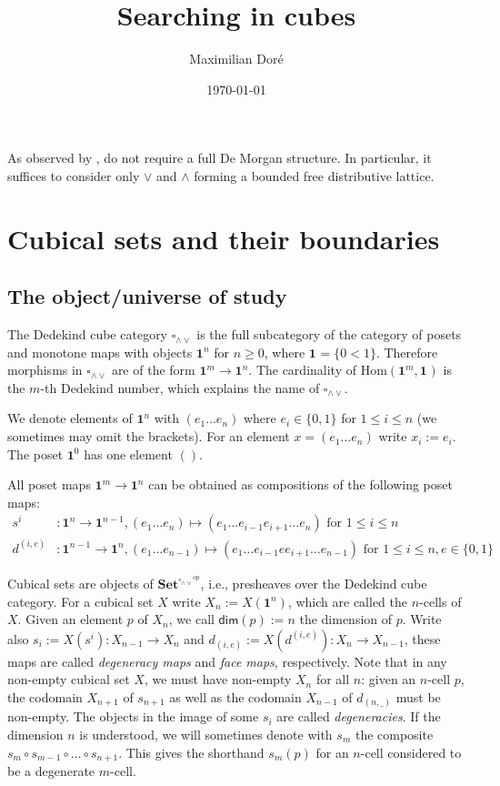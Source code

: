 \documentclass[11pt]{article}
\title{ Searching in cubes}
\author{ Maximilian Dor\'e}
\date{\today}
\theoremstyle{definition}
\newcommand{\mdef}{:=}
\newcommand{\mname}[1]{\textit{{#1}}}
\newcommand{\join}{\wedge}
\newcommand{\meet}{\vee}
\newcommand{\dedekind}{\square_{\join \meet}}
\newcommand{\pint}[1]{\mathbf{1}^{#1}}
\newcommand{\psh}[1]{\mathbf{Set}^{{#1}^{op}}}
\renewcommand{\hom}[2]{\text{Hom}({#1} , {#2})}
\renewcommand{\dim}[1]{\mathsf{dim}({#1})}
\newcommand{\smap}[1]{s_{{#1}}}
\newcommand{\dmap}[2]{d_{({#1} , {#2})}}
\begin{document}
\maketitle	

As observed by \cite{orton17_axiom_model_cubic_type_theor_topos}, do not require
a full De Morgan structure. In particular, it suffices to consider only $\meet$
and $\join$ forming a bounded free distributive lattice.

\section{Cubical sets and their boundaries}

\subsection{The object/universe of study}

The Dedekind cube category $\dedekind$ is the full subcategory of the category
of posets and monotone maps with objects $\pint{n}$ for $n \geq 0$, where $\pint{}
= \{ 0<1 \}$. Therefore morphisms in $\dedekind$ are of
the form $\pint{m} \to \pint{n}$. The cardinality of $\hom{\pint{m}}{\pint{}}$ is the
$m$-th Dedekind number, which explains the name of $\dedekind$.

We denote elements of $\pint{n}$ with $(e_1 \ldots e_n)$ where $e_i \in \{0,1\}$
for $1 \leq i \leq n$ (we sometimes may omit the brackets). For an element $x =
(e_1 \ldots e_n)$ write $x_i \mdef e_i$. The poset $\pint{0}$ has one element
$()$.

All poset maps $\pint{m} \to \pint{n}$ can be obtained as
compositions of the following poset maps:
\begin{align*}
  s^i &: \pint{n} \to \pint{n-1}, (e_1 \ldots e_n) \mapsto (e_1 \ldots e_{i-1} e_{i+1} \ldots e_n) \text{ for } 1 \leq i \leq n\\
  d^{(i,e)} &: \pint{n-1} \to \pint{n}, 
      (e_1 \ldots e_{n-1}) \mapsto (e_1 \ldots e_{i-1} e e_{i+1} \ldots e_{n-1}) \text{ for } 1 \leq i \leq n, e \in \{0,1\}
\end{align*}


Cubical sets are objects of $\psh{\dedekind}$, i.e., presheaves over the
Dedekind cube category. For a cubical set $X$ write $X_n \mdef X(\pint{n})$,
which are called the $n$-cells of $X$. Given an element $p$ of $X_n$, we call
$\dim{p} \mdef n$ the dimension of $p$. Write also $\smap{i} \mdef X(s^i) : X_{n-1}
\to X_n$ and $\dmap{i}{e} \mdef X(d^{(i,e)}) : X_n \to X_{n-1}$, these maps are
called \mname{degeneracy maps} and \mname{face maps}, respectively. Note that in any non-empty
cubical set $X$, we must have non-empty $X_n$ for all $n$: given an $n$-cell
$p$, the codomain $X_{n+1}$ of $\smap{n+1}$ as well as the codomain $X_{n-1}$ of
$\dmap{n}{\_}$ must be non-empty. The objects in the image of some $\smap{i}$ are
called \mname{degeneracies}. If the dimension $n$ is understood, we will sometimes
denote with $\smap{m}$ the composite $\smap{m} \circ \smap{m-1} \circ \ldots
\circ \smap{n+1}$. This gives the shorthand $\smap{m}(p)$ for an $n$-cell
considered to be a degenerate $m$-cell.
\end{document}
